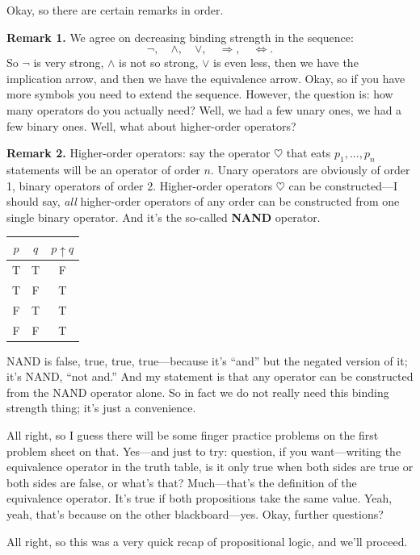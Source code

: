 Okay, so there are certain remarks in order.

\textbf{Remark 1.} We agree on decreasing binding strength in the sequence:
\[
\lnot, \quad \land, \quad \lor, \quad \Rightarrow, \quad \Leftrightarrow.
\]
So $\lnot$ is very strong, $\land$ is not so strong, $\lor$ is even less, then we have the implication arrow, and then we have the equivalence arrow. Okay, so if you have more symbols you need to extend the sequence. However, the question is: how many operators do you actually need? Well, we had a few unary ones, we had a few binary ones. Well, what about higher-order operators?

\textbf{Remark 2.} Higher-order operators: say the operator $\heartsuit$ that eats $p_1, \ldots, p_n$ statements will be an operator of order $n$. Unary operators are obviously of order 1, binary operators of order 2. Higher-order operators $\heartsuit$ can be constructed---I should say, \emph{all} higher-order operators of any order can be constructed from one single binary operator. And it's the so-called \textbf{NAND} operator.

\begin{center}
\begin{tabular}{cc|c}
$p$ & $q$ & $p \uparrow q$ \\
\hline
T & T & F \\
T & F & T \\
F & T & T \\
F & F & T \\
\end{tabular}
\end{center}

NAND is false, true, true, true---because it's ``and'' but the negated version of it; it's NAND, ``not and.'' And my statement is that any operator can be constructed from the NAND operator alone. So in fact we do not really need this binding strength thing; it's just a convenience.

All right, so I guess there will be some finger practice problems on the first problem sheet on that. Yes---and just to try: question, if you want---writing the equivalence operator in the truth table, is it only true when both sides are true or both sides are false, or what's that? Much---that's the definition of the equivalence operator. It's true if both propositions take the same value. Yeah, yeah, that's because on the other blackboard---yes. Okay, further questions?

All right, so this was a very quick recap of propositional logic, and we'll proceed.
